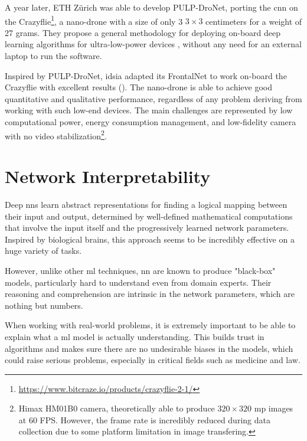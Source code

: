 A year later, ETH Zürich was able to develop PULP-DroNet, porting the \gls{cnn} on the Crazyflie\footnote{\url{https://www.bitcraze.io/products/crazyflie-2-1/}}, a nano-drone with a size of only 3 $3 \times 3$ centimeters for a weight of 27 grams. They propose a general methodology for deploying on-board deep learning algorithms for ultra-low-power devices \cite{palossi2019pulpdronetIoTJ}, without any need for an external laptop to run the software.

\medskip

Inspired by PULP-DroNet, \gls{idsia} adapted its FrontalNet to work on-board the Crazyflie with excellent results (\cite{zimmerman2020thesis}). The nano-drone is able to achieve good quantitative and qualitative performance, regardless of any problem deriving from working with such low-end devices. The main challenges are represented by low computational power, energy consumption management, and low-fidelity camera with no video stabilization\footnote{Himax HM01B0 camera, theoretically able to produce $320 \times 320$ \gls{mp} images at 60 FPS. However, the frame rate is incredibly reduced during data collection due to some platform limitation in image transfering.}.




\section{Network Interpretability}
\label{sec:network-interpretability}


Deep \gls{nn}s learn abstract representations for finding a logical mapping between their input and output, determined by well-defined mathematical computations that involve the input itself and the progressively learned network parameters. Inspired by biological brains, this approach seems to be incredibly effective on a huge variety of tasks.

\medskip 

However, unlike other \gls{ml} techniques, \gls{nn} are known to produce "black-box" models, particularly hard to understand even from domain experts. Their reasoning and comprehension are intrinsic in the network parameters, which are nothing but numbers.

When working with real-world problems, it is extremely important to be able to explain what a \gls{ml} model is actually understanding. This builds trust in algorithms and makes sure there are no undesirable biases in the models, which could raise serious problems, especially in critical fields such as medicine and law.

